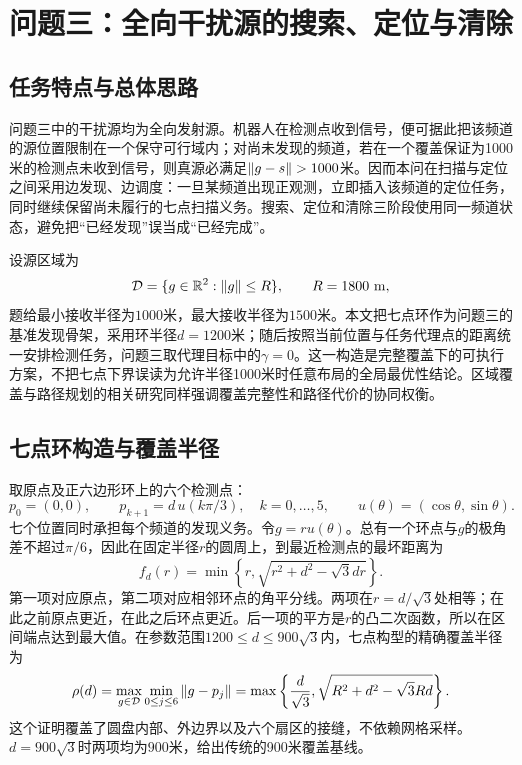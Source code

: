 \section{问题三：全向干扰源的搜索、定位与清除}
\label{new:sec-q3}

\subsection{任务特点与总体思路}
问题三中的干扰源均为全向发射源。机器人在检测点收到信号，便可据此把该频道的源位置限制在一个保守可行域内；对尚未发现的频道，若在一个覆盖保证为1000米的检测点未收到信号，则真源必满足\(\left\lVert g-s\right\rVert>1000\)米。因而本问在扫描与定位之间采用边发现、边调度：一旦某频道出现正观测，立即插入该频道的定位任务，同时继续保留尚未履行的七点扫描义务。搜索、定位和清除三阶段使用同一频道状态，避免把“已经发现”误当成“已经完成”。

设源区域为
\[
 \mathcal D=\{g\in\mathbb R^2:\left\lVert g\right\rVert\le R\},\qquad R=1800\ \mathrm m,
\]
题给最小接收半径为$1000$米，最大接收半径为$1500$米。本文把七点环作为问题三的基准发现骨架，采用环半径$d=1200$米；随后按照当前位置与任务代理点的距离统一安排检测任务，问题三取代理目标中的$\gamma=0$。这一构造是完整覆盖下的可执行方案，不把七点下界误读为允许半径1000米时任意布局的全局最优性结论。区域覆盖与路径规划的相关研究同样强调覆盖完整性和路径代价的协同权衡\cite{ren,jia}。

\subsection{七点环构造与覆盖半径}
取原点及正六边形环上的六个检测点：
\begin{equation}
 p_0=(0,0),\qquad p_{k+1}=d\,u(k\pi/3),\quad k=0,\ldots,5,
 \qquad u(\theta)=(\cos\theta,\sin\theta).
 \label{new:eq-seven-points}
\end{equation}
七个位置同时承担每个频道的发现义务。令$g=r u(\theta)$。总有一个环点与$g$的极角差不超过$\pi/6$，因此在固定半径$r$的圆周上，到最近检测点的最坏距离为
\begin{equation}
 f_d(r)=\min\left\{r,\sqrt{r^2+d^2-\sqrt3dr}\right\}.
 \label{new:eq-ring-envelope}
\end{equation}
第一项对应原点，第二项对应相邻环点的角平分线。两项在$r=d/\sqrt3$处相等；在此之前原点更近，在此之后环点更近。后一项的平方是$r$的凸二次函数，所以在区间端点达到最大值。在参数范围$1200\le d\le900\sqrt3$内，七点构型的精确覆盖半径为
\begin{equation}
 \rho(d)=\max_{g\in\mathcal D}\min_{0\le j\le6}\left\lVert g-p_j\right\rVert
 =\max\left\{\frac d{\sqrt3},
 \sqrt{R^2+d^2-\sqrt3Rd}\right\}.
 \label{new:eq-ring-radius}
\end{equation}
这个证明覆盖了圆盘内部、外边界以及六个扇区的接缝，不依赖网格采样。$d=900\sqrt3$时两项均为$900$米，给出传统的900米覆盖基线。

